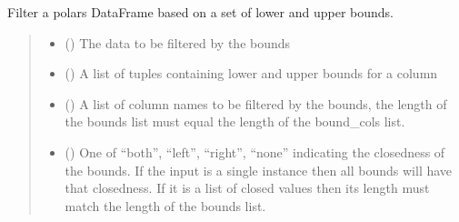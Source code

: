 \documentclass[letterpaper,10pt,english]{sphinxmanual}
\begin{document}
\begin{fulllineitems}
\label{\detokenize{misc:glomar_gridding.utils.filter_bounds}}
\pysigstartsignatures
\pysiglinewithargsret
{}
{\sphinxparamcomma {}\sphinxparamcomma {}\sphinxparamcomma {}}
{}
\pysigstopsignatures
\sphinxAtStartPar
Filter a polars DataFrame based on a set of lower and upper bounds.
\begin{quote}\begin{description}
\begin{itemize}
\item {}
\sphinxAtStartPar
{} () \textendash{} The data to be filtered by the bounds

\item {}
\sphinxAtStartPar
{} (\sphinxstyleliteralemphasis{\sphinxupquote{{[}}}\sphinxstyleliteralemphasis{\sphinxupquote{{[}}}\sphinxstyleliteralemphasis{\sphinxupquote{, }}\sphinxstyleliteralemphasis{\sphinxupquote{{]}}}\sphinxstyleliteralemphasis{\sphinxupquote{{]}}}) \textendash{} A list of tuples containing lower and upper bounds for a column

\item {}
\sphinxAtStartPar
{} (\sphinxstyleliteralemphasis{\sphinxupquote{{[}}}\sphinxstyleliteralemphasis{\sphinxupquote{{]}}}) \textendash{} A list of column names to be filtered by the bounds, the length of
the bounds list must equal the length of the bound\_cols list.

\item {}
\sphinxAtStartPar
{} (\sphinxstyleliteralemphasis{\sphinxupquote{ | }}\sphinxstyleliteralemphasis{\sphinxupquote{{[}}}\sphinxstyleliteralemphasis{\sphinxupquote{{]}}}) \textendash{} One of “both”, “left”, “right”, “none” indicating the closedness of
the bounds. If the input is a single instance then all bounds will have
that closedness. If it is a list of closed values then its length must
match the length of the bounds list.


\end{itemize}
\end{description}
\end{quote}
\end{fulllineitems}
\end{document}
